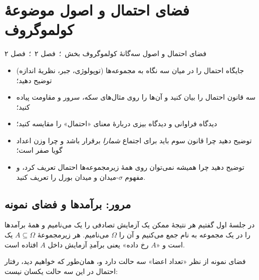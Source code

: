 \chapter{فضای احتمال و اصول موضوعهٔ کولموگروف}
\label{ch:s2}

{فضای احتمال و اصول سه‌گانهٔ کولموگروف}
{ بخش  \,؛\,  فصل ۲ \,؛\,  فصل ۲}
{\begin{itemize}
  \item جایگاه احتمال را در میان سه نگاه به مجموعه‌ها (توپولوژی، جبر، نظریهٔ اندازه) توضیح دهید؛
  \item سه قانون احتمال را بیان کنید و آن‌ها را روی مثال‌های سکه، سرور و مقاومت پیاده کنید؛
  \item دیدگاه فراوانی و دیدگاه بیزی دربارهٔ معنای «احتمال» را مقایسه کنید؛
  \item توضیح دهید چرا قانون سوم باید برای اجتماع \emph{شمارا} برقرار باشد و چرا وزن اعداد گویا صفر است؛
  \item توضیح دهید چرا همیشه نمی‌توان روی همهٔ زیرمجموعه‌ها احتمال تعریف کرد، و مفهوم $\sigma$-میدان و میدان بورل را تعریف کنید.
\end{itemize}}

\section{مرور: برآمدها و فضای نمونه}

در جلسهٔ اول گفتیم هر نتیجهٔ ممکن یک آزمایش تصادفی را یک  می‌نامیم و همهٔ برآمدها را در یک مجموعه به نام  جمع می‌کنیم و آن را $\Omega$ می‌نامیم. هر زیرمجموعهٔ $A\subseteq\Omega$ یک  است و «$A$ رخ داده» یعنی برآمدِ آزمایش داخل $A$ افتاده است.

فضای نمونه از نظر «تعداد اعضا» سه حالت دارد و، همان‌طور که خواهیم دید، رفتار احتمال در این سه حالت یکسان نیست:

